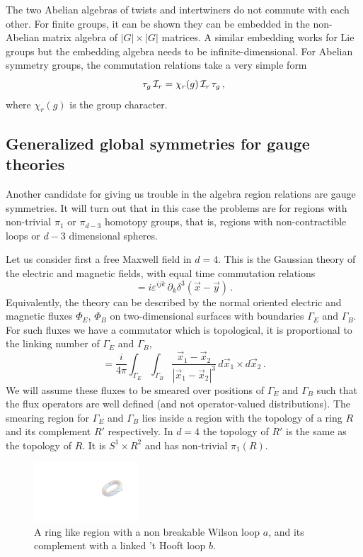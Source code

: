 \documentclass[12pt]{article}
\numberwithin{equation}{section}
\newcommand{\be}{\begin{equation}}
\newcommand{\ee}{\end{equation}}
\begin{document}
The two Abelian algebras of twists and intertwiners do not commute with each other. For finite groups, it can be shown they can be embedded in the non-Abelian matrix algebra of $|G|\times |G|$ matrices. A similar embedding works for Lie groups but the embedding algebra needs to be infinite-dimensional. For Abelian symmetry groups, the commutation relations take a very simple form
\be\label{ccrel}
\tau_g \, {\cal I}_r = \chi_r(g) \, {\cal I}_r \, \tau_g\,,  
\ee 
where $\chi_r(g)$ is the group character. 



\subsection{Generalized global symmetries for gauge theories}

Another candidate for giving us trouble in the algebra region relations are gauge symmetries. It will turn out that in this case the problems are for regions with non-trivial $\pi_1$ or $\pi_{d-3}$ homotopy groups, that is, regions with non-contractible loops or $d-3$ dimensional spheres. 

Let us consider first a free Maxwell field in $d=4$.  This is the Gaussian theory of the electric and magnetic fields, with equal time commutation relations
\be
[E^i(\vec{x}),B^j(\vec{y})]=i \varepsilon^{ijk}\, \partial_k \delta^3(\vec{x}-\vec{y})\,.
\ee
Equivalently, the theory can be described by the normal oriented electric and magnetic fluxes $\Phi_E$, $\Phi_B$ on two-dimensional surfaces with boundaries $\Gamma_E$ and $\Gamma_B$.  For such fluxes we have a commutator which is topological, it is proportional to the linking number of $\Gamma_E$ and $\Gamma_B$,
\be
[\Phi_E,\Phi_B]=\frac{i}{4\pi}\int_{\Gamma_E}\int_{\Gamma_B} \frac{\vec{x}_1-\vec{x}_2}{|\vec{x}_1-\vec{x}_2|^3}\, d\vec{x}_1\times d\vec{x}_2  \,.\label{deci}
\ee  
We will assume these fluxes to be smeared over positions of $\Gamma_E$ and $\Gamma_B$ such that the flux operators are well defined (and not operator-valued distributions). The smearing region for $\Gamma_E$ and $\Gamma_B$ lies inside a region with the topology of a ring $R$ and its complement $R'$ respectively. In $d=4$ the topology of $R'$ is the same as the topology of $R$. It is $S^1\times R^2$ and has non-trivial $\pi_1(R)$. 

\begin{figure}[t]
\begin{center}  
\includegraphics[width=0.35\textwidth]{toro.pdf}
\captionsetup{width=0.9\textwidth}
\caption{A ring like region with a non breakable Wilson loop $a$, and its complement with a linked  't Hooft loop $b$.}
\label{toro}
\end{center}  
\end{figure}  
\end{document}
